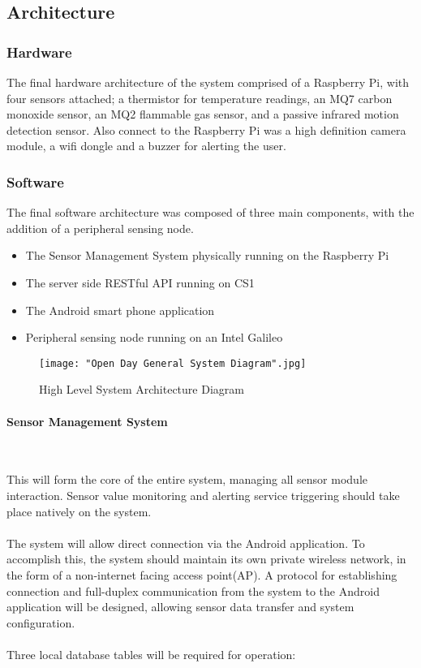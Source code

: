 \documentclass{article}
\begin{document}
\subsection{Architecture}

\subsubsection{Hardware}
The final hardware architecture of the system comprised of a Raspberry Pi, with four sensors attached; a thermistor for temperature readings, an MQ7 carbon monoxide sensor, an MQ2 flammable gas sensor, and a passive infrared motion detection sensor. Also connect to the Raspberry Pi was a high definition camera module, a wifi dongle and a buzzer for alerting the user.


\subsubsection{Software}
The final software architecture was composed of three main components, with the addition of a peripheral sensing node.

\begin{itemize}
  \item The Sensor Management System physically running on the Raspberry Pi
  \item The server side RESTful API running on CS1
  \item The Android smart phone application
  \item Peripheral sensing node running on an Intel Galileo 
\end{itemize}


\begin{figure}[h]
\centering
\texttt{[image: "Open Day General System Diagram".jpg]}
\caption{High Level System Architecture Diagram\label{overflow}}
\end{figure}

\paragraph{Sensor Management System}\

This will form the core of the entire system, managing all sensor module interaction. Sensor value monitoring and alerting service triggering should take place natively on the system. \\\\ The system will allow direct connection via the Android application. To accomplish this, the system should maintain its own private wireless network, in the form of a non-internet facing access point(AP). A protocol for establishing connection and full-duplex communication from the system to the Android application will be designed, allowing sensor data transfer and system configuration. \\\\ Three local database tables will be required for operation:
\end{document}
